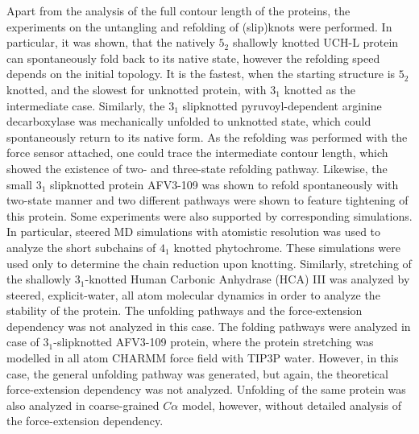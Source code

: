 Apart from the analysis of the full contour length of the proteins, the experiments on the untangling and refolding of (slip)knots were performed.
In particular, it was shown, that the natively $5_2$ shallowly knotted UCH-L protein can spontaneously fold back to its native state, however the refolding speed depends on the initial topology.
It is the fastest, when the starting structure is $5_2$ knotted, and the slowest for unknotted protein, with $3_1$ knotted as the intermediate case.
Similarly, the $3_1$ slipknotted pyruvoyl-dependent arginine decarboxylase was mechanically unfolded to unknotted state, which could spontaneously return to its native form.
As the refolding was performed with the force sensor attached, one could trace the intermediate contour length, which showed the existence of two- and three-state refolding pathway\cite{wang2019mechanical}.
Likewise, the small $3_1$ slipknotted protein AFV3-109 was shown to refold spontaneously with two-state manner\cite{he2019direct} and two different pathways were shown to feature tightening of this protein\cite{he2014mechanically}.
Some experiments were also supported by corresponding simulations.
In particular, steered MD simulations with atomistic resolution was used to analyze the short subchains of $4_1$ knotted phytochrome\cite{bornschlogl2009tightening}.
These simulations were used only to determine the chain reduction upon knotting.
Similarly, stretching of the shallowly $3_1$-knotted Human Carbonic Anhydrase (HCA) III was analyzed by steered, explicit-water, all atom molecular dynamics in order to analyze the stability of the protein\cite{dzubiella2013tightening}.
The unfolding pathways and the force-extension dependency was not analyzed in this case.
The folding pathways were analyzed in case of $3_1$-slipknotted AFV3-109 protein, where the protein stretching was modelled in all atom CHARMM force field with TIP3P water.
However, in this case, the general unfolding pathway was generated, but again, the theoretical force-extension dependency was not analyzed.
Unfolding of the same protein was also analyzed in coarse-grained $C\alpha$ model\cite{sulkowska2009jamming}, however, without detailed analysis of the force-extension dependency.

